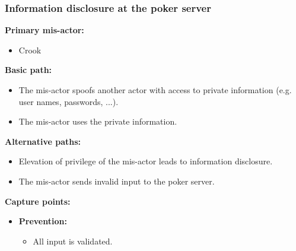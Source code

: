 \documentclass[a4paper,11pt]{report}
\begin{document}
\subsubsection{Information disclosure at the poker server}
\label{PokerServerCasesI}
\textbf{Primary mis-actor:}
\begin{itemize}
\item Crook
\end{itemize}
\textbf{Basic path:}
\begin{itemize}
\item The mis-actor spoofs another actor with access to private information (e.g. user names, passwords, ...).
\item The mis-actor uses the private information.
\end{itemize}
\textbf{Alternative paths:}
\begin{itemize}
\item Elevation of privilege of the mis-actor leads to information disclosure.
\item The mis-actor sends invalid input to the poker server.
\end{itemize}
\textbf{Capture points:}
\begin{itemize}
\item \textbf{Prevention:}
\begin{itemize}
\item All input is validated.
\end{itemize}
\end{itemize}
\end{document}
